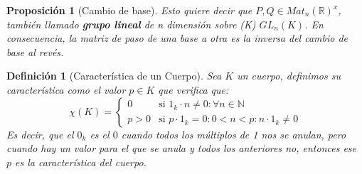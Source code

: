 \documentclass[10pt,a4paper,openright]{book}
\theoremstyle{break}
\newtheorem*{defi}{Definición}
\newtheorem*{prop}{Proposición}
\begin{document}
\begin{prop}[Cambio de base]
Esto quiere decir que $P,Q\in Mat_n(\mathbb R)^x$, también llamado \textbf{grupo lineal} de \textit{n} dimensión sobre (K) $GL_n(K)$. En consecuencia, la matriz de paso de una base a otra es la inversa del cambio de base al revés.
\end{prop}

\begin{defi}[Característica de un Cuerpo]
Sea $K$ un cuerpo, definimos su característica como el valor $p\in K$ que verifica que:
$$\chi(K)=\begin{cases}0 & \mbox{si }1_k\cdot n\neq 0: \forall n\in \mathbb N \\
p>0 & \mbox{si }p\cdot 1_k=0: 0<n<p: n\cdot 1_k\neq 0\end{cases}$$
Es decir, que el $0_k$ es el $0$ cuando todos los múltiplos de 1 nos se anulan, pero cuando hay un valor para el que se anula y todos los anteriores no, entonces ese $p$ es la característica del cuerpo.
\end{defi}
\end{document}

